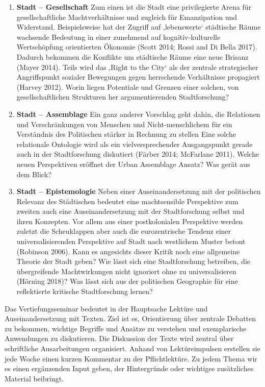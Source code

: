 \documentclass[
  ngerman,
]{article}
\begin{document}
\begin{enumerate}
\def\labelenumi{\arabic{enumi}.}
\item
  \textbf{Stadt -- Gesellschaft} Zum einen ist die Stadt eine privilegierte Arena für gesellschaftliche Machtverhältnisse und zugleich für Emanzipation und Widerstand. Beispielsweise hat der Zugriff auf ‚lebenswerte` städtische Räume wachsende Bedeutung in einer zunehmend auf kognitiv-kulturelle Wertschöpfung orientierten Ökonomie (Scott 2014; Rossi and Di Bella 2017). Dadurch bekommen die Konflikte um städtische Räume eine neue Brisanz (Mayer 2014). Teils wird das ‚Right to the City` als der zentrale strategischer Angriffspunkt sozialer Bewegungen gegen herrschende Verhältnisse propagiert (Harvey 2012). Worin liegen Potentiale und Grenzen einer solchen, von gesellschaftlichen Strukturen her argumentierenden Stadtforschung?
\item
  \textbf{Stadt -- Assemblage} Ein ganz anderer Vorschlag geht dahin, die Relationen und Verschränkungen von Menschen und Nicht-menschlichem für ein Verständnis des Politischen stärker in Rechnung zu stellen Eine solche relationale Ontologie wird als ein vielversprechender Ausgangspunkt gerade auch in der Stadtforschung diskutiert (Färber 2014; McFarlane 2011). Welche neuen Perspektiven eröffnet der Urban Assemblage Ansatz? Was gerät aus dem Blick?
\item
  \textbf{Stadt -- Epistemologie} Neben einer Auseinandersetzung mit der politischen Relevanz des Städtischen bedeutet eine machtsensible Perspektive zum zweiten auch eine Auseinandersetzung mit der Stadtforschung selbst und ihren Konzepten. Vor allem aus einer postkolonialen Perspektive werden zuletzt die Scheuklappen aber auch die eurozentrische Tendenz einer universalisierenden Perspektive auf Stadt nach westlichem Muster betont (Robinson 2006). Kann es angesichts dieser Kritik noch eine allgemeine Theorie der Stadt geben? Wie lässt sich eine Stadtforschung betreiben, die übergreifende Machtwirkungen nicht ignoriert ohne zu universalisieren (Hörning 2018)? Was lässt sich aus der politischen Geographie für eine reflektierte kritische Stadtforschung lernen?
\end{enumerate}

Das Vertiefungsseminar bedeutet in der Hauptsache Lektüre und Auseinandersetzung mit Texten. Ziel ist es, Orientierung über zentrale Debatten zu bekommen, wichtige Begriffe und Ansätze zu verstehen und exemplarische Anwendungen zu diskutieren. Die Diskussion der Texte wird zentral über schriftliche Ausarbeitungen organisiert. Anhand von Lektüreimpulsen erstellen sie jede Woche einen kurzen Kommentar zu der Pflichtlektüre. Zu jedem Thema wir es einen ergänzenden Input geben, der Hintergründe oder wichtiges zusätzliches Material beibringt.
\end{document}
